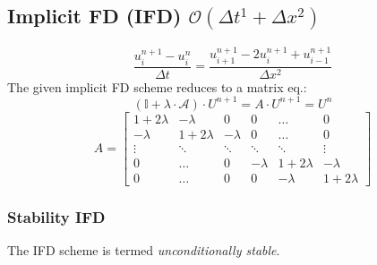 \subsection{Implicit FD (IFD) \texorpdfstring{\hfill $\mathcal{O}(\Delta t^1 + \Delta x^2)$}{O(t1+x2)}}
    \vspace{-0.5em}
    $$
        \frac{u_i^{n+1} - u_i^{n}}{\Delta t} = \frac{u_{i+1}^{n+1} -2 u_{i}^{n+1} + u_{i-1}^{n+1}}{\Delta x^2}
    $$
    The given implicit FD scheme reduces to a matrix eq.:
    $$(\mathbb{I} + \lambda \cdot \mathcal{A}) \cdot U^{n+1} = \boxed{
        A \cdot U^{n+1} = U^n
    }$$
    $$
        A = 
        \begin{bmatrix}
            1+2\lambda & -\lambda &  0 & 0 & \dots & 0 \\
            -\lambda &  1+2\lambda & -\lambda & 0 & \dots & 0 \\
            \vdots & \ddots & \ddots & \ddots & \ddots & \vdots \\
            0 & \dots & 0 & -\lambda &  1+2\lambda & -\lambda \\
            0 & \dots & 0 & 0 &  -\lambda &  1+2\lambda 
        \end{bmatrix}
    $$
    \subsubsection{Stability IFD}
        The IFD scheme is termed \textit{unconditionally stable}.